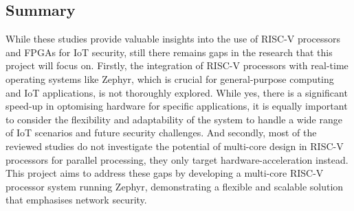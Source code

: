 \subsection{Summary}
While these studies provide valuable insights into the use of RISC-V processors and FPGAs for IoT security, still there remains gaps in the research that this project will focus on. Firstly, the integration of RISC-V processors with real-time operating systems like Zephyr, which is crucial for general-purpose computing and IoT applications, is not thoroughly explored. While yes, there is a significant speed-up in optomising hardware for specific applications, it is equally important to consider the flexibility and adaptability of the system to handle a wide range of IoT scenarios and future security challenges. And secondly, most of the reviewed studies do not investigate the potential of multi-core design in RISC-V processors for parallel processing, they only target hardware-acceleration instead. This project aims to address these gaps by developing a multi-core RISC-V processor system running Zephyr, demonstrating a flexible and scalable solution that emphasises network security.
